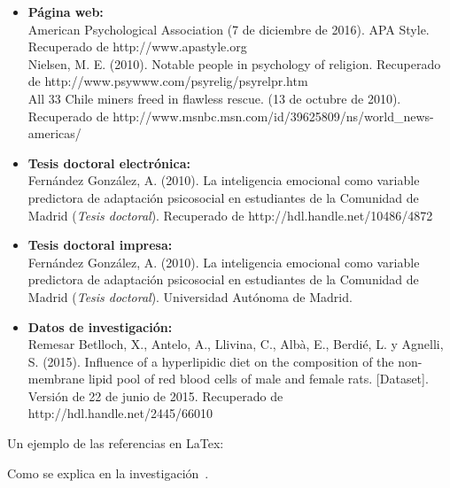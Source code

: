{\begin{itemize}
  \item \textbf{Página web:}\\
  American Psychological Association (7 de diciembre de 2016). APA Style. Recuperado de http://www.apastyle.org \\
  Nielsen, M. E. (2010). Notable people in psychology of religion. Recuperado de http://www.psywww.com/psyrelig/psyrelpr.htm \\
  All 33 Chile miners freed in flawless rescue. (13 de octubre de 2010). Recuperado de http://www.msnbc.msn.com/id/39625809/ns/world\_news-americas/

  \item \textbf{Tesis doctoral electrónica:}\\
  Fernández González, A. (2010). La inteligencia emocional como variable predictora de adaptación psicosocial en estudiantes de la Comunidad de Madrid (\textit{Tesis doctoral}). Recuperado de http://hdl.handle.net/10486/4872

  \item \textbf{Tesis doctoral impresa:}\\
  Fernández González, A. (2010). La inteligencia emocional como variable predictora de adaptación psicosocial en estudiantes de la Comunidad de Madrid (\textit{Tesis doctoral}). Universidad Autónoma de Madrid.

  \item \textbf{Datos de investigación:}\\
  Remesar Betlloch, X., Antelo, A., Llivina, C., Albà, E., Berdié, L. y Agnelli, S. (2015). Influence of a hyperlipidic diet on the composition of the non-membrane lipid pool of red blood cells of male and female rats. [Dataset]. Versión de 22 de junio de 2015. Recuperado de http://hdl.handle.net/2445/66010
\end{itemize}

Un ejemplo de las referencias en LaTex:

Como se explica en la investigación~\citep{sanchez2021}.
  
}


